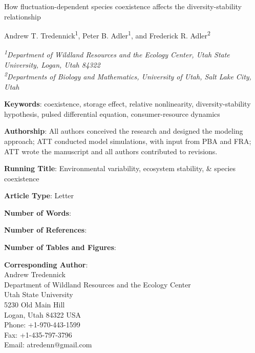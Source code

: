 \documentclass[12pt,]{article}
\title{}
\author{}
\date{}
\begin{document}
\maketitle


\renewcommand\linenumberfont{\normalfont\tiny\sffamily\color{gray}}

\begin{singlespace}

\begin{centering}

\Large{How fluctuation-dependent species coexistence affects the diversity-stability relationship}



\vspace{2.5em}

\renewcommand*{\thefootnote}{\fnsymbol{footnote}}

\normalsize{Andrew T. Tredennick\textsuperscript{1}, Peter B. Adler\textsuperscript{1}, and Frederick R. Adler\textsuperscript{2}}

\vspace{1.5em}

\textit{\small{\textsuperscript{1}Department of Wildland Resources and the Ecology Center, Utah State University, Logan, Utah 84322}} \\
\textit{\small{\textsuperscript{2}Departments of Biology and Mathematics, University of Utah, Salt Lake City, Utah}} 

\end{centering}

\vspace{3em}

\noindent \textbf{Keywords}: coexistence, storage effect, relative nonlinearity, diversity-stability hypothesis, pulsed differential equation, consumer-resource dynamics

\noindent \textbf{Authorship}: All authors conceived the research and designed the modeling approach; ATT conducted model simulations, with input from PBA and FRA; ATT wrote the manuscript and all authors contributed to revisions.

\noindent \textbf{Running Title}: Environmental variability, ecosystem stability, \& species coexistence

\noindent \textbf{Article Type}: Letter

\noindent \textbf{Number of Words}:

\noindent \textbf{Number of References}:

\noindent \textbf{Number of Tables and Figures}:

\noindent \textbf{Corresponding Author}:  \\
Andrew Tredennick  \\
Department of Wildland Resources and the Ecology Center  \\
Utah State University  \\
5230 Old Main Hill  \\
Logan, Utah 84322 USA  \\
Phone: +1-970-443-1599  \\
Fax: +1-435-797-3796  \\
Email: atredenn@gmail.com

\end{singlespace}
\end{document}
